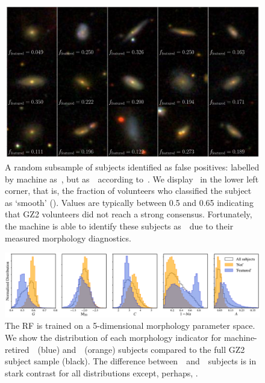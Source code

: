 \begin{figure}
\centering
\includegraphics[width=\textwidth]{Figures/human_machine/f12.pdf}
\caption[Random subsample of galaxy jpegs identified as false positives by the Random Forest]{A random subsample of subjects identified as false positives: labelled by machine as~\feat, but as~\notfeat~according to~\raw. We display \fsmooth~in the lower left corner, that is, the fraction of volunteers who classified the subject as `smooth' (\notfeat). Values are typically between 0.5 and 0.65 indicating that GZ2 volunteers did not reach a strong consensus. Fortunately, the machine is able to identify these subjects as~\feat~due to their measured morphology diagnostics. \label{fig: machine false pos}}
\end{figure}


\begin{figure}
\centering
\includegraphics[width=\textwidth]{Figures/human_machine/morph_params_raw_labels_4paper.pdf}
\caption[Distributions of measured galaxy morphology features.]{The RF is trained on a 5-dimensional morphology parameter space. We show the distribution of each morphology indicator for machine-retired~\feat~(blue) and~\notfeat~(orange) subjects compared to the full GZ2 subject sample (black). The difference between~\feat~and~\notfeat~subjects is in stark contrast for all distributions except, perhaps, .  \label{fig: morph params}}
\end{figure}

